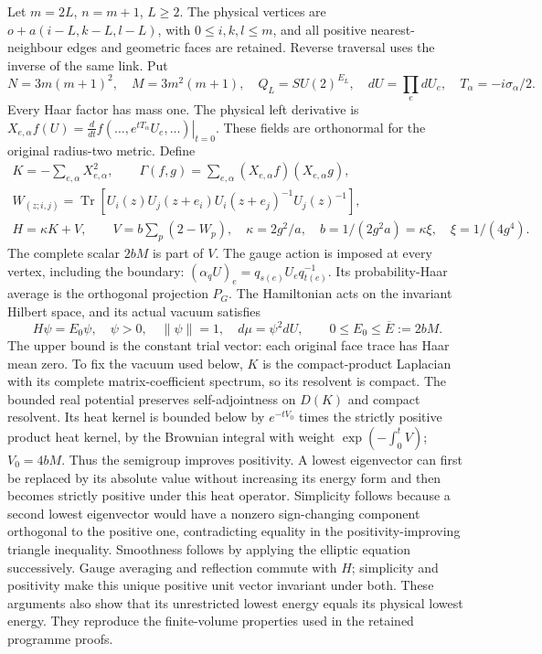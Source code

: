 \documentclass[11pt]{article}
\begin{document}
Let \(m=2L\), \(n=m+1\), \(L\ge2\). The physical vertices are
\(o+a(i-L,k-L,l-L)\), with \(0\le i,k,l\le m\), and all positive nearest-neighbour edges and geometric faces are retained. Reverse traversal uses the inverse of the same link. Put
\[
 N=3m(m+1)^2,\quad M=3m^2(m+1),\quad
 Q_L=SU(2)^{E_L},\quad dU=\prod_e dU_e,\quad
 T_\alpha=-i\sigma_\alpha/2 .
 \tag{AT1}
\]
Every Haar factor has mass one. The physical left derivative is
\(X_{e,\alpha}f(U)=\left.\frac{d}{dt}f(\ldots,e^{tT_\alpha}U_e,\ldots)\right|_{t=0}\).
These fields are orthonormal for the original radius-two metric. Define
\[
 \begin{gathered}
 K=-\sum_{e,\alpha}X_{e,\alpha}^2,\qquad
 \Gamma(f,g)=\sum_{e,\alpha}(X_{e,\alpha}f)(X_{e,\alpha}g),\\
 W_{(z;i,j)}=\operatorname{Tr}
  [U_i(z)U_j(z+e_i)U_i(z+e_j)^{-1}U_j(z)^{-1}],\\
 H=\kappa K+V,\qquad
 V=b\sum_p(2-W_p),\quad
 \kappa=2g^2/a,\quad b=1/(2g^2a)=\kappa\xi,\quad \xi=1/(4g^4).
 \end{gathered}\tag{AT2}
\]
The complete scalar \(2bM\) is part of \(V\). The gauge action is imposed at every vertex, including the boundary:
\((\alpha_qU)_e=q_{s(e)}U_eq_{t(e)}^{-1}\).
Its probability-Haar average is the orthogonal projection \(P_G\). The Hamiltonian acts on the invariant Hilbert space, and its actual vacuum satisfies
\[
 H\psi=E_0\psi,\quad\psi>0,\quad\|\psi\|=1,\quad
 d\mu=\psi^2dU,\qquad
 0\le E_0\le\overline E:=2bM.
 \tag{AT3}
\]
The upper bound is the constant trial vector: each original face trace has Haar mean zero. To fix the vacuum used below, \(K\) is the compact-product Laplacian with its complete matrix-coefficient spectrum, so its resolvent is compact. The bounded real potential preserves self-adjointness on \(D(K)\) and compact resolvent. Its heat kernel is bounded below by \(e^{-tV_0}\) times the strictly positive product heat kernel, by the Brownian integral with weight \(\exp(-\int_0^t V)\); \(V_0=4bM\). Thus the semigroup improves positivity. A lowest eigenvector can first be replaced by its absolute value without increasing its energy form and then becomes strictly positive under this heat operator. Simplicity follows because a second lowest eigenvector would have a nonzero sign-changing component orthogonal to the positive one, contradicting equality in the positivity-improving triangle inequality. Smoothness follows by applying the elliptic equation successively. Gauge averaging and reflection commute with \(H\); simplicity and positivity make this unique positive unit vector invariant under both. These arguments also show that its unrestricted lowest energy equals its physical lowest energy. They reproduce the finite-volume properties used in the retained programme proofs.
\end{document}
